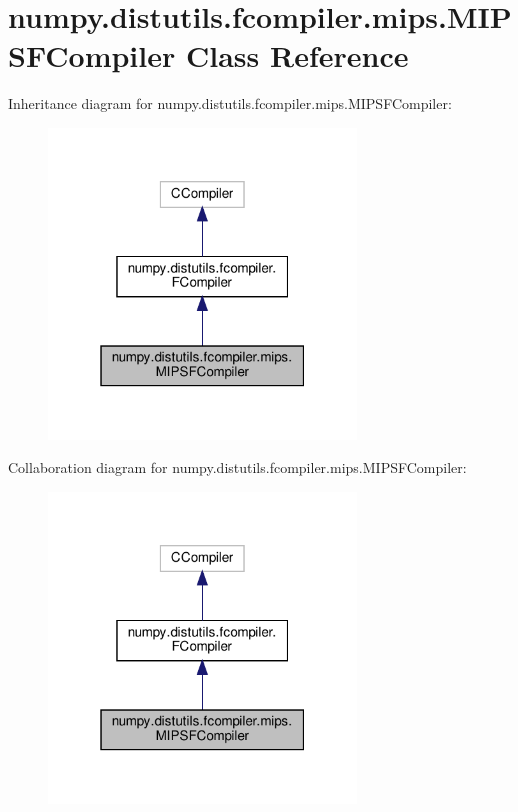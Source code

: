 \hypertarget{classnumpy_1_1distutils_1_1fcompiler_1_1mips_1_1MIPSFCompiler}{}\section{numpy.\+distutils.\+fcompiler.\+mips.\+M\+I\+P\+S\+F\+Compiler Class Reference}
\label{classnumpy_1_1distutils_1_1fcompiler_1_1mips_1_1MIPSFCompiler}


Inheritance diagram for numpy.\+distutils.\+fcompiler.\+mips.\+M\+I\+P\+S\+F\+Compiler\+:
\nopagebreak
\begin{figure}[H]
\begin{center}
\leavevmode
\includegraphics[width=232pt]{classnumpy_1_1distutils_1_1fcompiler_1_1mips_1_1MIPSFCompiler__inherit__graph}
\end{center}
\end{figure}


Collaboration diagram for numpy.\+distutils.\+fcompiler.\+mips.\+M\+I\+P\+S\+F\+Compiler\+:
\nopagebreak
\begin{figure}[H]
\begin{center}
\leavevmode
\includegraphics[width=232pt]{classnumpy_1_1distutils_1_1fcompiler_1_1mips_1_1MIPSFCompiler__coll__graph}
\end{center}
\end{figure}
